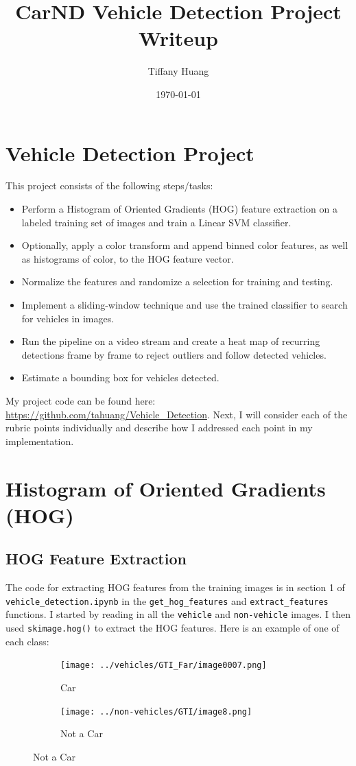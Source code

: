 \documentclass[12pt]{article}
\title{CarND Vehicle Detection Project Writeup}
\author{Tiffany Huang}
\date{\today}
\begin{document}
\maketitle


\section{Vehicle Detection Project}
This project consists of the following steps/tasks:
\begin{itemize}
\item {Perform a Histogram of Oriented Gradients (HOG) feature extraction on a labeled training set of images and train a Linear SVM classifier.}
\item {Optionally, apply a color transform and append binned color features, as well as histograms of color, to the HOG feature vector.}
\item {Normalize the features and randomize a selection for training and testing.}
\item {Implement a sliding-window technique and use the trained classifier to search for vehicles in images.}
\item {Run the pipeline on a video stream and create a heat map of recurring detections frame by frame to reject outliers and follow detected vehicles.}
\item {Estimate a bounding box for vehicles detected.}
\end{itemize}
My project code can be found here: \url{https://github.com/tahuang/Vehicle_Detection}. Next, I will consider each of the rubric points individually and describe how I addressed each point in my implementation.

\section{Histogram of Oriented Gradients (HOG)}

\subsection{HOG Feature Extraction}
The code for extracting HOG features from the training images is in section 1 of \newline
\texttt{vehicle\_detection.ipynb} in the \texttt{get\_hog\_features} and \texttt{extract\_features} functions. I started by reading in all the \texttt{vehicle} and \texttt{non-vehicle} images. I then used \texttt{skimage.hog()} to extract the HOG features. Here is an example of one of each class:
\begin{figure}[!h]
\centering
\begin{subfigure}{0.495\textwidth}
\centering
\texttt{[image: ../vehicles/GTI\_Far/image0007.png]}
\caption{Car}
\end{subfigure}
\begin{subfigure}{0.495\textwidth}
\centering
\texttt{[image: ../non-vehicles/GTI/image8.png]}
\caption{Not a Car}
\end{subfigure}
\end{figure}
\end{document}
